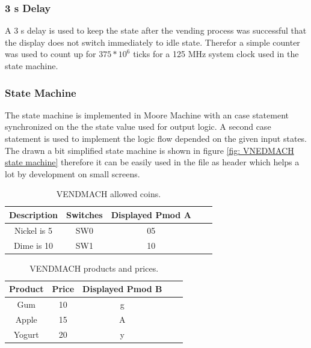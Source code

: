 \subsubsection{3 s Delay}\label{subsubsec: 3s Delay}
A 3 s delay is used to keep the state after the vending process was successful that the display does not switch immediately to idle state. Therefor a simple counter was used to count up for $375*10^6$ ticks for a 125 MHz system clock used in the state machine. 

\subsubsection{State Machine}\label{subsubsec: State Machine}
The state machine is implemented in Moore Machine with an case statement synchronized on the the state value used for output logic. A second case statement is used to implement the logic flow depended on the given input states. The drawn  a bit simplified state machine is shown in figure \ref{fig: VNEDMACH state machine} therefore it can be easily used in the file as header which helps a lot by development on small screens. 
\begin{table}[H]
	\begin{center}
		\begin{tabular}{|| c | c | c | c | c ||} 
			\hline
			  Description & Switches & Displayed Pmod A  \\ [0.5ex] 
			\hline\hline
			Nickel is 5 \cent 	& SW0 	& 	05  	\\ \hline
			Dime is 10 \cent 	& SW1	&	10  	\\ \hline
			
		\end{tabular}
	\end{center}
	\caption{VENDMACH allowed coins.}\label{tab: VENDMACH allowed coins.}
\end{table}

\begin{table}[H]
	\begin{center}
		\begin{tabular}{|| c | c | c | c | c ||} 
			\hline
			Product & Price  & Displayed Pmod B \\ [0.5ex] 
			\hline\hline
			Gum  	& 10 \cent	& g		\\ \hline
			Apple 	& 15 \cent	& A  	\\ \hline
			Yogurt 	& 20 \cent	& y  	\\ \hline		
		\end{tabular}
	\end{center}
	\caption{VENDMACH products and prices.} \label{tab: VENDMACH products and prices.}
\end{table}
\newpage
